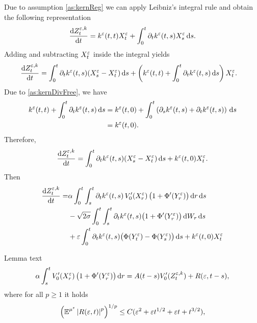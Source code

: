 \documentclass[10pt]{article}
\begin{document}
Due to assumption \eqref{as:kernReg} we can apply Leibniz's integral rule and obtain the following representation
\begin{equation}
	\frac{\mathrm{d} Z^{\varepsilon,k}_t}{\mathrm{d} t} = k^\varepsilon(t, t)X^\varepsilon_t + \int_0^t \partial_t k^\varepsilon(t, s) X^\varepsilon_s \,\mathrm{d} s.
\end{equation}
Adding and subtracting $X_t^\varepsilon$ inside the integral yields
\begin{equation}
\begin{aligned}
	\frac{\mathrm{d} Z^{\varepsilon,k}_t}{\mathrm{d} t} &= \int_0^t \partial_t k^\varepsilon(t, s) (X^\varepsilon_s - X^\varepsilon_t) \,\mathrm{d} s + \left(k^\varepsilon(t, t) + \int_0^t \partial_t k^\varepsilon(t, s) \,\mathrm{d} s\right)X^\varepsilon_t.
\end{aligned}
\end{equation}
Due to \eqref{as:kernDivFree}, we have
\begin{equation}
\begin{aligned}
	k^\varepsilon(t, t) + \int_0^t \partial_t k^\varepsilon(t, s) \,\mathrm{d} s &= k^\varepsilon(t, 0) + \int_0^t \left(\partial_s k^\varepsilon(t, s) + \partial_t k^\varepsilon(t, s)\right) \,\mathrm{d} s\\
	&= k^\varepsilon(t, 0).
\end{aligned}
\end{equation}
Therefore, 
\begin{equation}
\begin{aligned}
	\frac{\mathrm{d} Z^{\varepsilon,k}_t}{\mathrm{d} t} = \int_0^t \partial_t k^\varepsilon(t, s) (X^\varepsilon_s - X^\varepsilon_t) \,\mathrm{d} s + k^\varepsilon(t, 0) X^\varepsilon_t.
\end{aligned}
\end{equation}
Then
\begin{equation}
\begin{aligned}
\frac{\mathrm{d} Z^{\varepsilon,k}_t}{\mathrm{d} t} = &\alpha \int_0^t\int_s^t \partial_t k^\varepsilon(t, s) \, V_0'(X^\varepsilon_r)\, \big(1 + \Phi'(Y^\varepsilon_r)\big)\,\mathrm{d} r \,\mathrm{d} s  \\
&-\sqrt{2\sigma}\int_0^t\int_s^t \partial_t k^\varepsilon(t, s) \big(1 + \Phi'(Y^\varepsilon_r)\big) \,\mathrm{d} W_r \,\mathrm{d} s\\
&+ \varepsilon \int_0^t \partial_t k^\varepsilon(t, s) \big(\Phi(Y^\varepsilon_t)- \Phi(Y^\varepsilon_s)\big) \,\mathrm{d} s + k^\varepsilon(t, 0) X^\varepsilon_t
\end{aligned}
\end{equation}

\begin{lemma} Lemma text
	\begin{equation}
		\alpha \int_s^t V_0'(X^\varepsilon_r)\, \big(1 + \Phi'(Y^\varepsilon_r)\big)\,\mathrm{d} r = A (t - s)V'_0(Z_t^{\varepsilon, k}) + R(\varepsilon, t-s),
	\end{equation}
	where for all $p \geq 1$ it holds
	\begin{equation}
		\left( \operatorname{\mathbb{E}}^{\mu^\varepsilon} \left\lvert R(\varepsilon, t)\right\rvert^p \right)^{1/p} \leq C(\varepsilon^2 + \varepsilon t^{1/2} + \varepsilon t + t^{3/2}),
	\end{equation}
\end{lemma}
\end{document}
